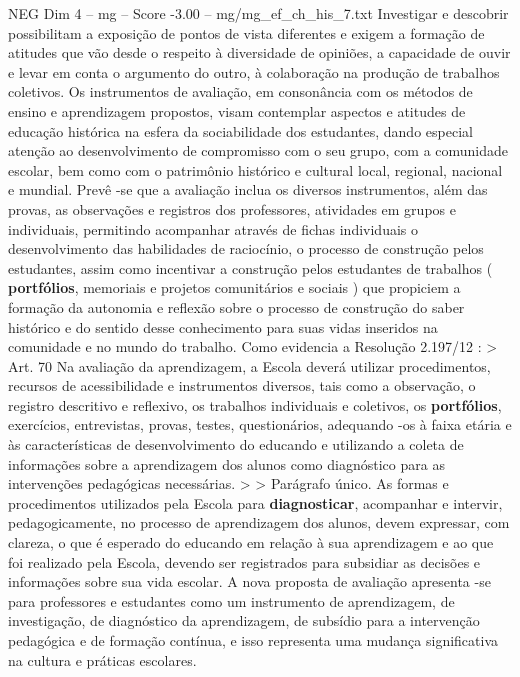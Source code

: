 \begin{textsample}{NEG Dim 4 – mg – Score -3.00 – mg/mg\_ef\_ch\_his\_7.txt}
Investigar e descobrir possibilitam a exposição de pontos de vista diferentes e exigem a formação de atitudes que vão desde o respeito à diversidade de opiniões, a capacidade de ouvir e levar em conta o argumento do outro, à colaboração na produção de trabalhos coletivos.
Os instrumentos de avaliação, em consonância com os métodos de ensino e aprendizagem propostos, visam contemplar aspectos e atitudes de educação histórica na esfera da sociabilidade dos estudantes, dando especial atenção ao desenvolvimento de compromisso com o seu grupo, com a comunidade escolar, bem como com o patrimônio histórico e cultural local, regional, nacional e mundial.
Prevê -se que a avaliação inclua os diversos instrumentos, além das provas, as observações e registros dos professores, atividades em grupos e individuais, permitindo acompanhar através de fichas individuais o desenvolvimento das habilidades de raciocínio, o processo de construção pelos estudantes, assim como incentivar a construção pelos estudantes de trabalhos ( \textbf{portfólios}, memoriais e projetos comunitários e sociais ) que propiciem a formação da autonomia e reflexão sobre o processo de construção do saber histórico e do sentido desse conhecimento para suas vidas inseridos na comunidade e no mundo do trabalho.
Como evidencia a Resolução 2.197/12 : > Art. 70 Na avaliação da aprendizagem, a Escola deverá utilizar procedimentos, recursos de acessibilidade e instrumentos diversos, tais como a observação, o registro descritivo e reflexivo, os trabalhos individuais e coletivos, os \textbf{portfólios}, exercícios, entrevistas, provas, testes, questionários, adequando -os à faixa etária e às características de desenvolvimento do educando e utilizando a coleta de informações sobre a aprendizagem dos alunos como diagnóstico para as intervenções pedagógicas necessárias. > > Parágrafo único.
As formas e procedimentos utilizados pela Escola para \textbf{diagnosticar}, acompanhar e intervir, pedagogicamente, no processo de aprendizagem dos alunos, devem expressar, com clareza, o que é esperado do educando em relação à sua aprendizagem e ao que foi realizado pela Escola, devendo ser registrados para subsidiar as decisões e informações sobre sua vida escolar.
A nova proposta de avaliação apresenta -se para professores e estudantes como um instrumento de aprendizagem, de investigação, de diagnóstico da aprendizagem, de subsídio para a intervenção pedagógica e de formação contínua, e isso representa uma mudança significativa na cultura e práticas escolares.

\end{textsample}
